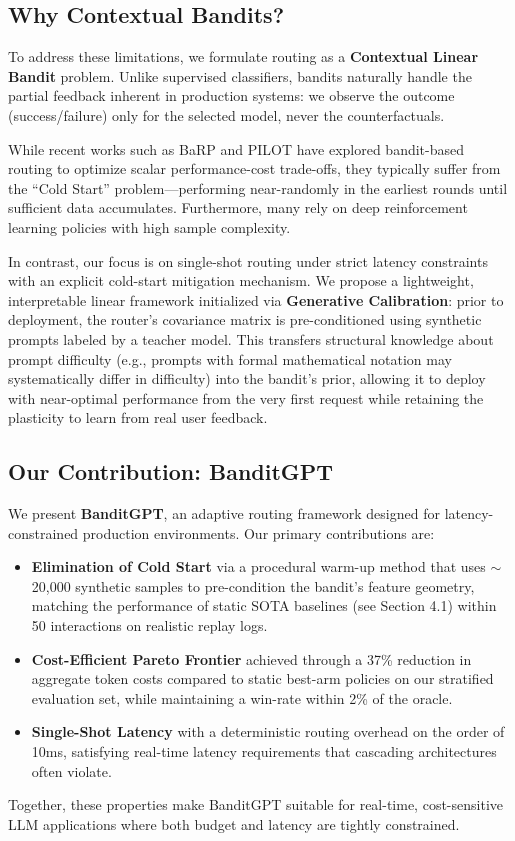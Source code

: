 \subsection{Why Contextual Bandits?}
To address these limitations, we formulate routing as a \textbf{Contextual Linear Bandit} problem. Unlike supervised classifiers, bandits naturally handle the partial feedback inherent in production systems: we observe the outcome (success/failure) only for the selected model, never the counterfactuals.

While recent works such as BaRP \cite{ruan2024barp} and PILOT \cite{shin2023pilot} have explored bandit-based routing to optimize scalar performance-cost trade-offs, they typically suffer from the ``Cold Start'' problem---performing near-randomly in the earliest rounds until sufficient data accumulates. Furthermore, many rely on deep reinforcement learning policies with high sample complexity.

In contrast, our focus is on single-shot routing under strict latency constraints with an explicit cold-start mitigation mechanism. We propose a lightweight, interpretable linear framework initialized via \textbf{Generative Calibration}: prior to deployment, the router’s covariance matrix is pre-conditioned using synthetic prompts labeled by a teacher model. This transfers structural knowledge about prompt difficulty (e.g., prompts with formal mathematical notation may systematically differ in difficulty) into the bandit’s prior, allowing it to deploy with near-optimal performance from the very first request while retaining the plasticity to learn from real user feedback.

\subsection{Our Contribution: BanditGPT}
We present \textbf{BanditGPT}, an adaptive routing framework designed for latency-constrained production environments. Our primary contributions are:

\begin{itemize}
    \item \textbf{Elimination of Cold Start} via a procedural warm-up method that uses $\sim$20,000 synthetic samples to pre-condition the bandit's feature geometry, matching the performance of static SOTA baselines (see Section 4.1) within 50 interactions on realistic replay logs.
    \item \textbf{Cost-Efficient Pareto Frontier} achieved through a 37\% reduction in aggregate token costs compared to static best-arm policies on our stratified evaluation set, while maintaining a win-rate within 2\% of the oracle.
    \item \textbf{Single-Shot Latency} with a deterministic routing overhead on the order of 10ms, satisfying real-time latency requirements that cascading architectures often violate.
\end{itemize}

Together, these properties make BanditGPT suitable for real-time, cost-sensitive LLM applications where both budget and latency are tightly constrained.
